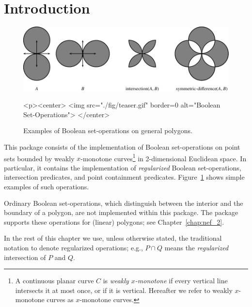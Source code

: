 \section{Introduction\label{bso_sec:intro}}

\begin{figure}[!htp]
\begin{center}
\begin{ccTexOnly}
  \includegraphics{Boolean_set_operations_2/fig/teaser}
\end{ccTexOnly}
\label{fig:teaser}
\begin{ccHtmlOnly}
  <p><center>
    <img src="./fig/teaser.gif" border=0 alt="Boolean Set-Operations">
  </center>
\end{ccHtmlOnly}
\caption{Examples of Boolean set-operations on general polygons.} 
\end{center}
\end{figure}

This package consists of the implementation of Boolean set-operations
on point sets bounded by weakly $x$-monotone curves\footnote{A continuous
planar curve $C$ is {\em weakly $x$-monotone} if every vertical line intersects it at
most once, or if it is vertical. Hereafter we refer to weakly $x$-monotone curves as  $x$-monotone curves.} in 2-dimensional Euclidean space. In particular,
it contains the implementation of {\em regularized} Boolean set-operations,
intersection predicates, and point containment predicates.
Figure~\ref{fig:teaser} shows simple examples of such operations.

Ordinary Boolean set-operations, which distinguish between the
interior and the boundary of a polygon, are not implemented within this
package. The  package supports these operations for (linear)
polygons; see Chapter~\ref{chap:nef_2}.

In the rest of this chapter we use, unless otherwise stated, the
traditional notation to denote regularized operations; e.g., $P \cap Q$
means the {\em regularized} intersection of $P$ and $Q$.

